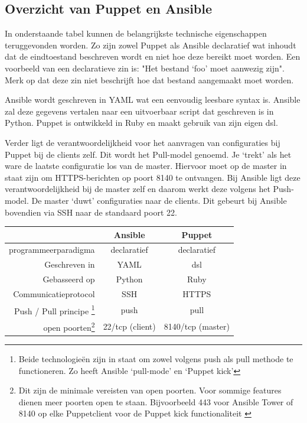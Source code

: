 \subsection{Overzicht van Puppet en Ansible}

In onderstaande tabel kunnen de belangrijkste technische eigenschappen teruggevonden worden. Zo zijn zowel Puppet als Ansible declaratief wat inhoudt dat de eindtoestand beschreven wordt en niet hoe deze bereikt moet worden. Een voorbeeld van een declaratieve zin is: "Het bestand `foo' moet aanwezig zijn". Merk op dat deze zin niet beschrijft hoe dat bestand aangemaakt moet worden.

Ansible wordt geschreven in YAML wat een eenvoudig leesbare syntax is. Ansible zal deze gegevens vertalen naar een uitvoerbaar script dat geschreven is in Python. Puppet is ontwikkeld in Ruby en maakt gebruik van zijn eigen \gls{dsl}. 

Verder ligt de verantwoordelijkheid voor het aanvragen van configuraties bij Puppet bij de clients zelf. Dit wordt het Pull-model genoemd. Je `trekt' als het ware de laatste configuratie los van de master. Hiervoor moet op de master in staat zijn om HTTPS-berichten op poort 8140 te ontvangen. Bij Ansible ligt deze verantwoordelijkheid bij de master zelf en daarom werkt deze volgens het Push-model. De master `duwt' configuraties naar de clients. Dit gebeurt bij Ansible bovendien via SSH naar de standaard poort 22.

\begin{minipage}{15cm}
\begin{tabular}{ r |c c }
& \textbf{Ansible} & \textbf{Puppet} \\
  \hline	  		
\gls{programmeerparadigma}  & declaratief & declaratief  \\
\hline
Geschreven in & YAML & \gls{dsl}  \\
\hline
Gebasseerd op & Python & Ruby \\
\hline
Communicatieprotocol & SSH & HTTPS \\

\hline
  Push / Pull principe \footnote{Beide technologie\"en zijn in staat om zowel volgens push als pull methode te functioneren. Zo heeft Ansible ‘pull-mode' \autocite{ansiblePull} en \textcite{puppetkick} ‘Puppet kick' } & \gls{push} & \gls{pull} \\
   \hline
   open poorten\footnote{Dit zijn de minimale vereisten van open poorten. Voor sommige features dienen meer poorten open te staan. Bijvoorbeeld 443 voor Ansible Tower of 8140 op elke Puppetclient voor de Puppet kick functionaliteit \autocite{puppetkick} }  & 22/tcp (client) & 8140/tcp (master)\\
  \end{tabular}
  \end{minipage}   

